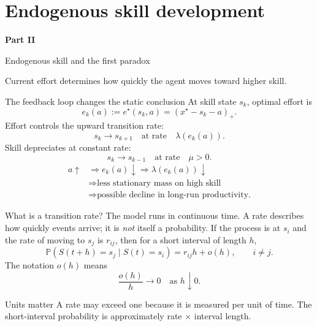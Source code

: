 \documentclass[aspectratio=169,10pt]{beamer}
\newcommand{\Pp}{\mathbb{P}}
\newcommand{\pos}[1]{\left(#1\right)_{+}}
\begin{document}

\section{Endogenous skill development}

\begin{frame}[plain]
\vspace{20mm}
{\color{white}\Huge\bfseries Part II\par}
\vspace{4mm}
{\color{white}\LARGE Endogenous skill and the first paradox\par}
\vspace{8mm}
{\color{white!75}\large Current effort determines how quickly the agent moves toward higher skill.\par}
\end{frame}

\begin{frame}{The feedback loop changes the static conclusion}
At skill state $s_k$, optimal effort is
\[
e_k(a):=e^\star(s_k,a)=\pos{x^\star-s_k-a}.
\]
Effort controls the upward transition rate:
\[
s_k\longrightarrow s_{k+1}
\quad\text{at rate}\quad
\lambda(e_k(a)).
\]
Skill depreciates at constant rate:
\[
s_k\longrightarrow s_{k-1}
\quad\text{at rate}\quad
\mu>0.
\]
\begin{align*}
a\uparrow
&\Rightarrow e_k(a)\downarrow
\Rightarrow\lambda(e_k(a))\downarrow\\
&\Rightarrow\text{less stationary mass on high skill}\\
&\Rightarrow\text{possible decline in long-run productivity.}
\end{align*}
\end{frame}

\begin{frame}{What is a transition rate?}
The model runs in continuous time. A rate describes how quickly events arrive; it is \emph{not} itself a probability.
\vspace{2mm}
If the process is at $s_i$ and the rate of moving to $s_j$ is $r_{ij}$, then for a short interval of length $h$,
\[
\Pp(S(t+h)=s_j\mid S(t)=s_i)
=r_{ij}h+o(h),
\qquad i\ne j.
\]
The notation $o(h)$ means
\[
\frac{o(h)}{h}\longrightarrow0
\quad\text{as }h\downarrow0.
\]
\begin{alertblock}{Units matter}
A rate may exceed one because it is measured per unit of time. The short-interval probability is approximately rate $\times$ interval length.
\end{alertblock}
\end{frame}
\end{document}
